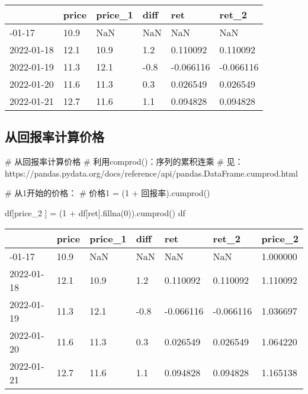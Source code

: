 \documentclass[
  letterpaper,
  DIV=11,
  numbers=noendperiod]{scrreprt}
\newenvironment{Shaded}{\begin{snugshade}}{\end{snugshade}}
\newcommand{\CommentTok}[1]{\textcolor[rgb]{0.37,0.37,0.37}{#1}}
\newcommand{\DecValTok}[1]{\textcolor[rgb]{0.68,0.00,0.00}{#1}}
\newcommand{\NormalTok}[1]{\textcolor[rgb]{0.00,0.23,0.31}{#1}}
\newcommand{\OperatorTok}[1]{\textcolor[rgb]{0.37,0.37,0.37}{#1}}
\newcommand{\StringTok}[1]{\textcolor[rgb]{0.13,0.47,0.30}{#1}}
\begin{document}
\begin{longtable}[]{@{}llllll@{}}
\toprule\noalign{}
& price & price\_1 & diff & ret & ret\_2 \\
\midrule\noalign{}
\endhead
\bottomrule\noalign{}
\endlastfoot
2022-01-17 & 10.9 & NaN & NaN & NaN & NaN \\
2022-01-18 & 12.1 & 10.9 & 1.2 & 0.110092 & 0.110092 \\
2022-01-19 & 11.3 & 12.1 & -0.8 & -0.066116 & -0.066116 \\
2022-01-20 & 11.6 & 11.3 & 0.3 & 0.026549 & 0.026549 \\
2022-01-21 & 12.7 & 11.6 & 1.1 & 0.094828 & 0.094828 \\
\end{longtable}

\hypertarget{ux4eceux56deux62a5ux7387ux8ba1ux7b97ux4ef7ux683c}{%
\subsection{从回报率计算价格}\label{ux4eceux56deux62a5ux7387ux8ba1ux7b97ux4ef7ux683c}}

\begin{Shaded}
\begin{Highlighting}[]
\CommentTok{\# 从回报率计算价格}
\CommentTok{\# 利用comprod()：序列的累积连乘}
\CommentTok{\# 见：https://pandas.pydata.org/docs/reference/api/pandas.DataFrame.cumprod.html}

\CommentTok{\# 从1开始的价格：}
\CommentTok{\# 价格1 = (1 + 回报率).cumprod()}


\NormalTok{df[}\StringTok{\textquotesingle{}price\_2\textquotesingle{}}\NormalTok{ ] }\OperatorTok{=}\NormalTok{  (}\DecValTok{1} \OperatorTok{+}\NormalTok{ df[}\StringTok{\textquotesingle{}ret\textquotesingle{}}\NormalTok{].fillna(}\DecValTok{0}\NormalTok{)).cumprod()}
\NormalTok{df}
\end{Highlighting}
\end{Shaded}

\begin{longtable}[]{@{}lllllll@{}}
\toprule\noalign{}
& price & price\_1 & diff & ret & ret\_2 & price\_2 \\
\midrule\noalign{}
\endhead
\bottomrule\noalign{}
\endlastfoot
2022-01-17 & 10.9 & NaN & NaN & NaN & NaN & 1.000000 \\
2022-01-18 & 12.1 & 10.9 & 1.2 & 0.110092 & 0.110092 & 1.110092 \\
2022-01-19 & 11.3 & 12.1 & -0.8 & -0.066116 & -0.066116 & 1.036697 \\
2022-01-20 & 11.6 & 11.3 & 0.3 & 0.026549 & 0.026549 & 1.064220 \\
2022-01-21 & 12.7 & 11.6 & 1.1 & 0.094828 & 0.094828 & 1.165138 \\
\end{longtable}
\end{document}
